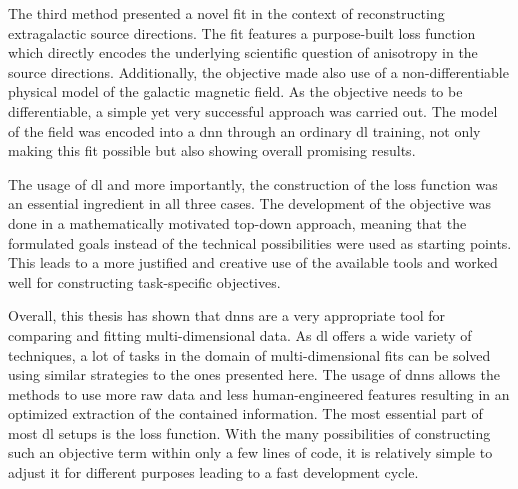 The third method presented a novel fit in the context of reconstructing extragalactic source directions. The fit features a purpose-built loss function which directly encodes the underlying scientific question of anisotropy in the source directions. Additionally, the objective made also use of a non-differentiable physical model of the galactic magnetic field. As the objective needs to be differentiable, a simple yet very successful approach was carried out. The model of the field was encoded into a \gls{dnn} through an ordinary \gls{dl} training, not only making this fit possible but also showing overall promising results.

The usage of \gls{dl} and more importantly, the construction of the loss function was an essential ingredient in all three cases. The development of the objective was done in a mathematically motivated top-down approach, meaning that the formulated goals instead of the technical possibilities were used as starting points. This leads to a more justified and creative use of the available tools and worked well for constructing task-specific objectives.

Overall, this thesis has shown that \glspl{dnn} are a very appropriate tool for comparing and fitting multi-dimensional data. As \gls{dl} offers a wide variety of techniques, a lot of tasks in the domain of multi-dimensional fits can be solved using similar strategies to the ones presented here. The usage of \glspl{dnn} allows the methods to use more raw data and less human-engineered features resulting in an optimized extraction of the contained information. The most essential part of most \gls{dl} setups is the loss function. With the many possibilities of constructing such an objective term within only a few lines of code, it is relatively simple to adjust it for different purposes leading to a fast development cycle.

